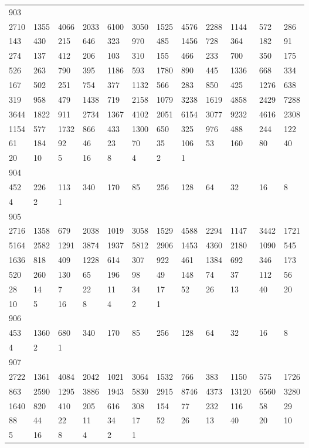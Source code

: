 \begin{longtable}{llllllllllll}
903&&&&&&&&&&&\\
2710& 1355& 4066& 2033& 6100& 3050& 1525& 4576& 2288& 1144& 572& 286\\
143& 430& 215& 646& 323& 970& 485& 1456& 728& 364& 182& 91\\
274& 137& 412& 206& 103& 310& 155& 466& 233& 700& 350& 175\\
526& 263& 790& 395& 1186& 593& 1780& 890& 445& 1336& 668& 334\\
167& 502& 251& 754& 377& 1132& 566& 283& 850& 425& 1276& 638\\
319& 958& 479& 1438& 719& 2158& 1079& 3238& 1619& 4858& 2429& 7288\\
3644& 1822& 911& 2734& 1367& 4102& 2051& 6154& 3077& 9232& 4616& 2308\\
1154& 577& 1732& 866& 433& 1300& 650& 325& 976& 488& 244& 122\\
61& 184& 92& 46& 23& 70& 35& 106& 53& 160& 80& 40\\
20& 10& 5& 16& 8& 4& 2& 1& \\

904&&&&&&&&&&&\\
452& 226& 113& 340& 170& 85& 256& 128& 64& 32& 16& 8\\
4& 2& 1& \\

905&&&&&&&&&&&\\
2716& 1358& 679& 2038& 1019& 3058& 1529& 4588& 2294& 1147& 3442& 1721\\
5164& 2582& 1291& 3874& 1937& 5812& 2906& 1453& 4360& 2180& 1090& 545\\
1636& 818& 409& 1228& 614& 307& 922& 461& 1384& 692& 346& 173\\
520& 260& 130& 65& 196& 98& 49& 148& 74& 37& 112& 56\\
28& 14& 7& 22& 11& 34& 17& 52& 26& 13& 40& 20\\
10& 5& 16& 8& 4& 2& 1& \\

906&&&&&&&&&&&\\
453& 1360& 680& 340& 170& 85& 256& 128& 64& 32& 16& 8\\
4& 2& 1& \\

907&&&&&&&&&&&\\
2722& 1361& 4084& 2042& 1021& 3064& 1532& 766& 383& 1150& 575& 1726\\
863& 2590& 1295& 3886& 1943& 5830& 2915& 8746& 4373& 13120& 6560& 3280\\
1640& 820& 410& 205& 616& 308& 154& 77& 232& 116& 58& 29\\
88& 44& 22& 11& 34& 17& 52& 26& 13& 40& 20& 10\\
5& 16& 8& 4& 2& 1& \\


\end{longtable}
